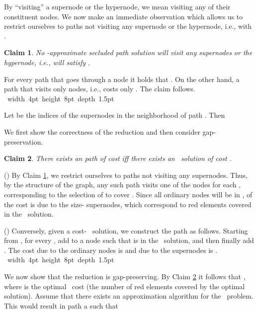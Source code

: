 \documentclass[12pt]{article}
\newtheorem{claim}{Claim}[section]
\def\Proof{\par\noindent{\bf Proof:~}}
\def\blackslug{\hbox{\hskip 1pt \vrule width 4pt height 8pt
    depth 1.5pt \hskip 1pt}}
\def\QED{\quad\blackslug\lower 8.5pt\null\par}
\newcommand{\PS}[0]{ 
}
\newcommand{\RBSC}[0]{  }
\begin{document}
By ``visiting'' a supernode or the hypernode, we mean visiting any of their constituent nodes.
We now make an immediate observation which allows us to restrict ourselves to  paths  not visiting any supernode or the hypernode, i.e., with .
\begin{claim}
\label{cl:approx_1_n}
No -approximate secluded path solution will visit any supernodes or the hypernode, i.e., will satisfy .
\end{claim}
\Proof
For every path  that goes through a node  it holds that . On the other hand, a path  that visits only  nodes, i.e.,  costs only . The claim follows.
\QED

Let  be the indices of the supernodes in the neighborhood of path . Then

We first show the correctness of the reduction and then consider gap-preservation.
\begin{claim}
\label{cl:rbcs_pp}
There exists an  path of cost  iff there exists an \RBSC\ solution of cost .
\end{claim}
\Proof
() By Claim \ref{cl:approx_1_n}, we restrict ourselves to paths not visiting any supernodes. Thus, by the structure of the graph, any such  path visits one of the nodes  for each , corresponding to the selection of  to cover . Since all  ordinary nodes will be in ,  of the cost is due to the size- supernodes, which correspond to  red elements covered in the \RBSC\ solution.

() Conversely, given a cost- \RBSC\ solution, we construct the path as follows. Starting from , for every , add to  a node  such that  is in the \RBSC\ solution, and then finally add . The cost due to the ordinary nodes is  and due to the  supernodes is .
\QED

We now show that the reduction is gap-preserving.
By Claim \ref{cl:rbcs_pp} it follows that , where  is the optimal \RBSC\ cost (the number of red elements  covered by the optimal solution).
Assume that there exists an  approximation algorithm for the \PS\ problem. This would result in path a  such that
\end{document}
